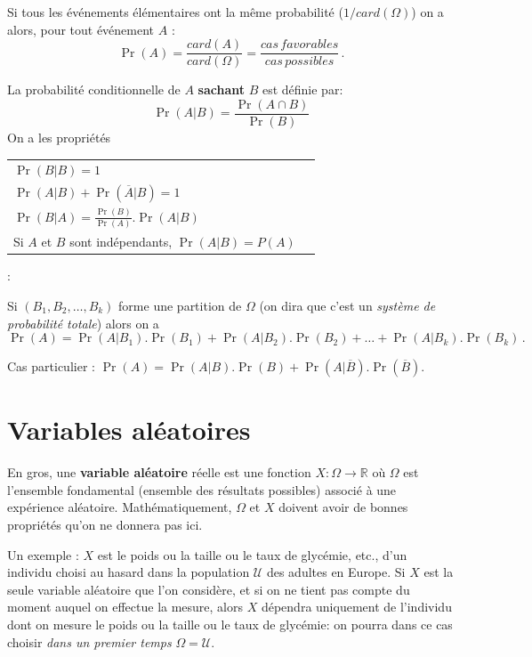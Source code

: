 \documentclass[12pt, a4paper]{book}
\numberwithin{equation}{section}
\begin{document}
 Si tous les événements élémentaires ont la même
probabilité ($1/card(\Omega)$) on a alors, pour tout événement $A$ :
$$
\Pr(A)=\frac{card(A)}{card(\Omega)}=\frac{cas\, favorables}{cas\, possibles}\,.
$$

  La probabilité conditionnelle de $A$ {\bf sachant} $B$ est
définie par:
$$
\Pr(A|B)=\frac{\Pr(A\cap B)}{\Pr(B)}
$$
On a les propriétés
\begin{center}
\begin{tabular}{|ll|}
\hline
$\Pr(B|B)=1$ & \\
$\Pr(A|B)+\Pr(\overline{A}|B)=1$ & \\
${\displaystyle \Pr(B|A)= \frac{\Pr(B)}{\Pr(A)}.\Pr(A|B)}$ & \\
Si $A$ et $B$ sont indépendants, $\Pr(A|B)=P(A)$ & \\
\hline
\end{tabular}
\end{center}


 :

Si $(B_1, B_2, \hdots, B_k)$ forme une partition de $\Omega$ (on dira que c'est un {\it système de 
probabilité totale}) alors on a
$$
\Pr(A)=\Pr(A|B_1).\Pr(B_1)+ \Pr(A|B_2).\Pr(B_2) + \hdots + \Pr(A|B_k).\Pr(B_k)\,.
$$

\noindent Cas particulier :
${\displaystyle \Pr(A)=  \Pr(A|B).\Pr(B)+\Pr(A| \overline{B}). \Pr(\overline{B})}$.\\


\section{Variables aléatoires} 

En gros, une {\bf variable aléatoire} réelle est une fonction $X:\Omega \longrightarrow \mathbb{R}$ où $\Omega $
est l'ensemble fondamental (ensemble des résultats possibles) associé à une expérience aléatoire. Mathématiquement, 
$\Omega $ et $X$ doivent avoir de bonnes propriétés qu'on ne donnera pas ici.


Un exemple : $X$ est le poids ou la taille ou le taux de glycémie, etc., d'un individu choisi au hasard dans la population $\mathcal{U}$ des adultes en Europe. Si $X$ est la seule variable aléatoire que l'on considère, et si on ne tient pas compte du moment auquel on effectue la mesure, alors $X$ dépendra uniquement de l'individu dont on mesure le poids ou la taille ou le taux de glycémie: on pourra dans ce cas choisir \emph{dans un premier temps} $\Omega=\mathcal{U}$.
\end{document}

